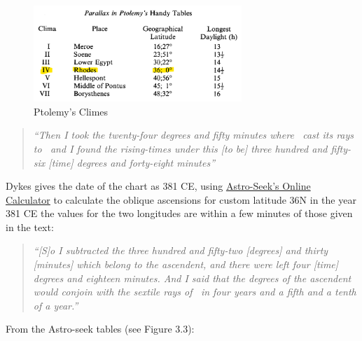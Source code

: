 \begin{figure}[H]
\centering
\includegraphics[width=0.7\textwidth]{diagrams/Ptolemy-climes}
\vspace{-0.5em}
\caption{Ptolemy's Climes}
\end{figure}

\begin{quote}
\textsl{``Then  I took the twenty-four degrees and fifty minutes where \Mars\, cast its rays to \Pisces\, and I found the rising-times under this [to be] three hundred and fifty-six [time] degrees and forty-eight minutes''}
\end{quote}

Dykes gives the date of the chart as 381 CE, using \href{https://horoscopes.astro-seek.com/calculate-ascensional-rising-times/?latitude=100&narozeni_lat_custom_stupne=36&narozeni_lat_custom_minuty=0&narozeni_lat_custom_smer=0&narozeni_rok=381&aya=&oa=4&decimal=1}{Astro-Seek's Online Calculator} to calculate the oblique ascensions for custom latitude 36N in the year 381 CE the values for the two longitudes are within a few minutes of those given in the text:

\begin{quote}
\textsl{ ``[S]o I subtracted the three hundred and fifty-two [degrees] and thirty [minutes] which belong to the ascendent, and there were left four [time] degrees and eighteen minutes. And I said that the degrees of the ascendent would conjoin with the sextile rays of \Mars\, in four years and a fifth and a tenth of a year.''}
\end{quote}
From the Astro-seek tables (see Figure 3.3):

